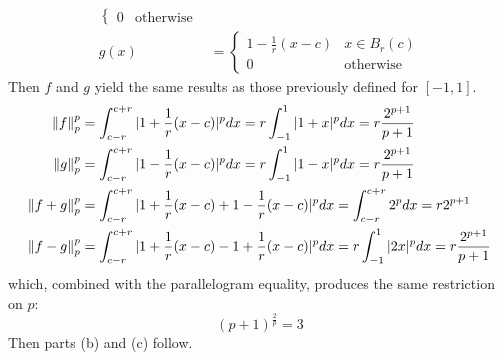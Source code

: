 \documentclass[../../Solutions.tex]{subfiles}
\begin{document}
\begin{itemize}
\begin{enumerate}[(a)]
\begin{equation*}
\begin{split}
\begin{cases}
					0 & \text{otherwise}
				\end{cases} \\
				g(x) &= \begin{cases}
					1-\frac{1}{r}(x-c) & x \in B_r(c) \\
					0 & \text{otherwise}
				\end{cases}
			\end{split} \end{equation*}
			Then $f$ and $g$ yield the same results as those previously defined for $[-1,1]$.
			\begin{equation*} \begin{split} 
				\left\lVert f\right\rVert_p^p & = \int_{c-r}^{c+r} |1+\frac{1}{r}(x-c)|^p dx = r\int_{-1}^{1} |1+x|^p dx = r\frac{2^{p+1}}{p+1} \\
				\left\lVert g\right\rVert_p^p & = \int_{c-r}^{c+r} |1-\frac{1}{r}(x-c)|^p dx = r\int_{-1}^{1} |1-x|^p dx = r\frac{2^{p+1}}{p+1} \\
				\left\lVert f+g\right\rVert_p^p & = \int_{c-r}^{c+r} |1+\frac{1}{r}(x-c)+1-\frac{1}{r}(x-c)|^p dx = \int_{c-r}^{c+r} 2^p dx = r2^{p+1} \\
				\left\lVert f-g\right\rVert_p^p & = \int_{c-r}^{c+r} |1+\frac{1}{r}(x-c)-1+\frac{1}{r}(x-c)|^p dx = r\int_{-1}^{1} |2x|^p dx = r\frac{2^{p+1}}{p+1}
			\end{split} \end{equation*}
			which, combined with the parallelogram equality, produces the same restriction on $p$:
			$$ (p+1)^{\frac{2}{p}} = 3 $$
			Then parts (b) and (c) follow.
	\end{enumerate}
	
\end{itemize}
\end{document}
